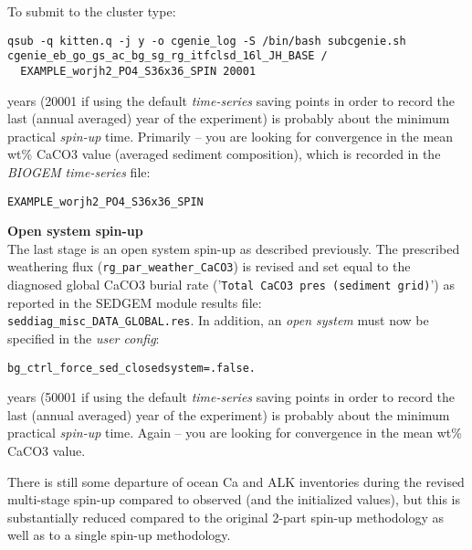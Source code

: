 \documentclass[10pt,twoside]{article}
\begin{document}
\begin{compactenum}
\noindent To submit to the cluster type:
\vspace{-5pt}\begin{verbatim}qsub -q kitten.q -j y -o cgenie_log -S /bin/bash subcgenie.sh
cgenie_eb_go_gs_ac_bg_sg_rg_itfclsd_16l_JH_BASE /
  EXAMPLE_worjh2_PO4_S36x36_SPIN 20001
\end{verbatim}\vspace{-5pt}

 years (20001 if using the default \textit{time-series} saving points in order to record the last (annual averaged) year of the experiment) is probably about the minimum practical \textit{spin-up} time. Primarily -- you are looking for convergence in the mean wt\% CaCO3 value (averaged sediment composition), which is recorded in the \textit{BIOGEM} \textit{time-series} file:
\vspace{-5pt}\begin{verbatim}EXAMPLE_worjh2_PO4_S36x36_SPIN\end{verbatim}\vspace{-5pt}

	\item \textbf{Open system spin-up}
	\\The last stage is an open system spin-up as described previously. The prescribed weathering flux (\texttt{rg\_par\_weather\_CaCO3}) is revised and set equal to the diagnosed global CaCO3 burial rate ('\texttt{Total CaCO3 pres (sediment grid)}') as reported in the SEDGEM module results file:
\\\texttt{seddiag\_misc\_DATA\_GLOBAL.res}.
In addition, an \textit{open system} must now be specified in the \textit{user config}:
\vspace{-5pt}\begin{verbatim}bg_ctrl_force_sed_closedsystem=.false.\end{verbatim}\vspace{-5pt}

 years (50001 if using the default \textit{time-series} saving points in order to record the last (annual averaged) year of the experiment) is probably about the minimum practical \textit{spin-up} time. Again -- you are looking for convergence in the mean wt\% CaCO3 value.

\end{compactenum}

There is still some departure of ocean Ca and ALK inventories during the revised multi-stage spin-up compared to observed (and the initialized values), but this is substantially reduced compared to the original 2-part spin-up methodology as well as to a single spin-up methodology.
\end{document}
